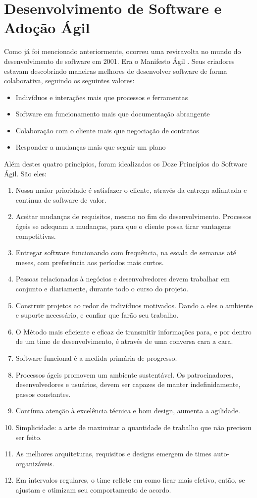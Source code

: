 \documentclass[a4paper,11pt]{article}
\begin{document}
\section{Desenvolvimento de Software e Adoção Ágil}
Como já foi mencionado anteriormente, ocorreu uma reviravolta no mundo do desenvolvimento de software em 2001. Era o Manifesto Ágil \cite{agileManifesto}. Seus criadores estavam descobrindo maneiras melhores de desenvolver software de forma colaborativa, seguindo os seguintes valores:
\begin{itemize}
	\item Indivíduos e interações mais que processos e ferramentas
	\item Software em funcionamento mais que documentação abrangente
	\item Colaboração com o cliente mais que negociação de contratos
	\item Responder a mudanças mais que seguir um plano
\end{itemize}

Além destes quatro princípios, foram idealizados os Doze Princípios do Software Ágil. São eles:
\begin{enumerate}
	\item Nossa maior prioridade é satisfazer o cliente, através da entrega adiantada e contínua de software de valor.
	\item Aceitar mudanças de requisitos, mesmo no fim do desenvolvimento. Processos ágeis se adequam a mudanças, para que o cliente possa tirar vantagens competitivas.
	\item Entregar software funcionando com frequência, na escala de semanas até meses, com preferência aos períodos mais curtos.
	\item Pessoas relacionadas à negócios e desenvolvedores devem trabalhar em conjunto e diariamente, durante todo o curso do projeto.
	\item Construir projetos ao redor de indivíduos motivados. Dando a eles o ambiente e suporte necessário, e confiar que farão seu trabalho.
	\item O Método mais eficiente e eficaz de transmitir informações para, e por dentro de um time de desenvolvimento, é através de uma conversa cara a cara.
	\item Software funcional é a medida primária de progresso.
	\item Processos ágeis promovem um ambiente sustentável. Os patrocinadores, desenvolvedores e usuários, devem ser capazes de manter indefinidamente, passos constantes.
	\item Contínua atenção à excelência técnica e bom design, aumenta a agilidade.
	\item Simplicidade: a arte de maximizar a quantidade de trabalho que não precisou ser feito.
	\item As melhores arquiteturas, requisitos e designs emergem de times auto-organizáveis.
	\item Em intervalos regulares, o time reflete em como ficar mais efetivo, então, se ajustam e otimizam seu comportamento de acordo.
\end{enumerate}
\end{document}
